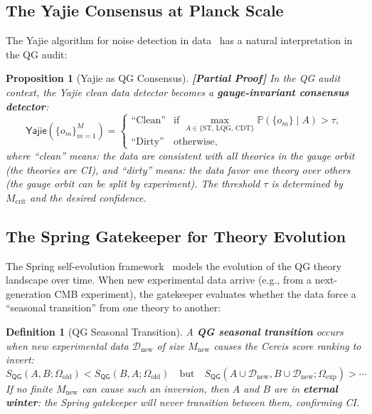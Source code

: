 \documentclass[12pt,a4paper]{article}
\newtheorem{proposition}[theorem]{Proposition}
\newtheorem{definition}[theorem]{Definition}
\theoremstyle{remark}
\newcommand{\Pbb}{\mathbb{P}}
\newcommand{\D}{\mathcal{D}}
\newcommand{\Yajie}{\textsf{Yajie}}
\newcommand{\Spring}{\textsf{Spring}}
\newcommand{\Cercis}{\textsf{Cercis}}
\newcommand{\CI}{\textsf{CI}}
\newcommand{\QG}{\textsf{QG}}
\newcommand{\rigorPartial}{\textbf{[Partial Proof]}}
\begin{document}
\subsection{The Yajie Consensus at Planck Scale}

The \Yajie{} algorithm for noise detection in data~\cite{scx_theory} has a natural interpretation in the QG audit:

\begin{proposition}[Yajie as QG Consensus]
\label{prop:yajie_qg}
\rigorPartial
In the QG audit context, the \Yajie{} clean data detector becomes a \textbf{gauge-invariant consensus detector}:
\begin{equation}
  \Yajie(\{o_m\}_{m=1}^{M}) =
  \begin{cases}
    \text{``Clean''} & \text{if } \max_{A \in \{\text{ST, LQG, CDT}\}} \Pbb(\{o_m\} \mid A) > \tau,\\[4pt]
    \text{``Dirty''} & \text{otherwise},
  \end{cases}
\end{equation}
where ``clean'' means: the data are consistent with \emph{all} theories in the gauge orbit (the theories are \CI{}), and ``dirty'' means: the data favor one theory over others (the gauge orbit can be split by experiment). The threshold $\tau$ is determined by $M_{\text{crit}}$ and the desired confidence.
\end{proposition}

\subsection{The Spring Gatekeeper for Theory Evolution}

The \Spring{} self-evolution framework~\cite{scx_spring} models the evolution of the QG theory landscape over time. When new experimental data arrive (e.g., from a next-generation CMB experiment), the gatekeeper evaluates whether the data force a ``seasonal transition'' from one theory to another:

\begin{definition}[QG Seasonal Transition]
\label{def:qg_seasonal}
A \textbf{QG seasonal transition} occurs when new experimental data $\D_{\text{new}}$ of size $M_{\text{new}}$ causes the \Cercis{} score ranking to invert:
\begin{equation}
  S_{\QG}(A, B; \Omega_{\text{old}}) < S_{\QG}(B, A; \Omega_{\text{old}})
  \quad \text{but} \quad
  S_{\QG}(A \cup \D_{\text{new}}, B \cup \D_{\text{new}}; \Omega_{\text{exp}}) > \cdots
\end{equation}
If no finite $M_{\text{new}}$ can cause such an inversion, then $A$ and $B$ are in \textbf{eternal winter}: the \Spring{} gatekeeper will never transition between them, confirming \CI{}.
\end{definition}
\end{document}
